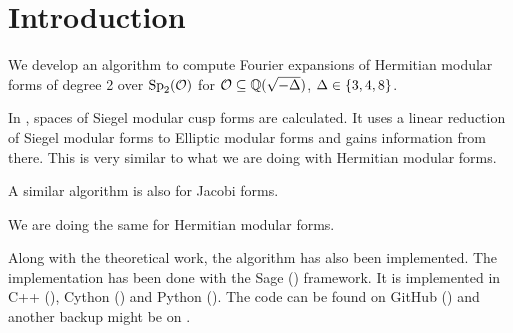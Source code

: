 
\section{Introduction}

We develop an algorithm to compute Fourier expansions of Hermitian modular forms of degree 2 over $\operatorname{Sp}_2(\mathcal{O})$ for $\mathcal{O} \subseteq \mathbb{Q}(\sqrt{-\Delta})$, $\Delta \in \Set{3,4,8}$.

In \cite{PoorYuen07Comp}, spaces of Siegel modular cusp forms are calculated. It uses a linear reduction of Siegel modular forms to Elliptic modular forms and gains information from there. This is very similar to what we are doing with Hermitian modular forms.

A similar algorithm is also \cite[Algorithm 4.3]{Raum12Jacobi} for Jacobi forms.

We are doing the same for Hermitian modular forms.

Along with the theoretical work, the algorithm has also been implemented. The implementation has been done with the Sage (\cite{sage}) framework. It is implemented in C++ (\cite{cpp}), Cython (\cite{cython}) and Python (\cite{python}). The code can be found on GitHub (\cite{Zeyer13Github}) and another backup might be on \cite{Zeyer13Homepage}.
